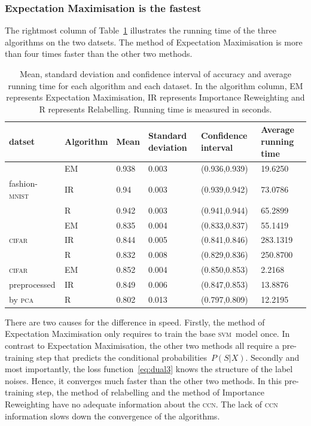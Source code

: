 \documentclass[12pt]{article} %
\newcommand{\svm}{\textsc{svm}}
\newcommand{\mnist}{fashion-\textsc{mnist}\ }
\begin{document}
\subsubsection{Expectation Maximisation is the fastest}
The rightmost column of Table~\ref{tab:Meansd} illustrates the running time of the three algorithms on the two datsets.
The method of Expectation Maximisation is more than four times faster than the other two methods.
\begin{table}
	\caption{Mean, standard deviation and confidence interval of accuracy and average running time for each algorithm and each dataset. In the algorithm column, EM represents Expectation Maximisation, IR represents Importance Reweighting and R represents Relabelling. Running time is measured in seconds.}
	\label{tab:Meansd}
\centering
\begin{tabular}{@{}llllll@{}}
\toprule
datset& Algorithm&Mean  & Standard deviation & Confidence interval & Average running time \\ \midrule
&EM&0.938 & 0.003              & (0.936,0.939)     & 19.6250\\
\mnist &IR&0.94  & 0.003              & (0.939,0.942)     & 73.0786\\
&R&0.942 & 0.003              & (0.941,0.944)     & 65.2899\\
\midrule
&EM&0.835 & 0.004              & (0.833,0.837)     & 55.1419\\
\textsc{cifar}&IR&0.844 & 0.005              & (0.841,0.846)     & 283.1319\\
  &R&0.832 & 0.008              & (0.829,0.836)     & 250.8700\\ 
\midrule
\textsc{cifar}&EM&0.852 & 0.004              & (0.850,0.853)     & 2.2168\\
 preprocessed&IR& 0.849 & 0.006              & (0.847,0.853)     & 13.8876\\
 by \textsc{pca}  &R& 0.802 & 0.013              & (0.797,0.809)     & 12.2195\\ 
\bottomrule
\end{tabular}
\end{table}
There are two  causes for the difference in speed.
Firstly, the method of Expectation Maximisation only requires to train the base \svm\ model once.
In contrast to Expectation Maximisation, the other two methods all require a pre-training step that predicts the conditional probabilities~$P(S|X)$.
Secondly and most importantly, the loss function~\eqref{eq:dual3} knows the structure of the label noises. Hence, it converges much faster than the other two methods.
In this pre-training step, the method of relabelling and the method of Importance Reweighting have no adequate information about the \textsc{ccn}.
The lack of \textsc{ccn} information slows down the convergence of the algorithms.
\end{document}
